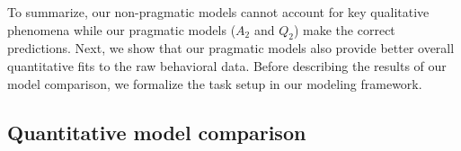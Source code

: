 \documentclass[11pt, floatsintext]{apa6}
\begin{document}


To summarize, our non-pragmatic models cannot account for key qualitative phenomena while our pragmatic models ($A_2$ and $Q_2$) make the correct predictions. 
Next, we show that our pragmatic models also provide better overall quantitative fits to the raw behavioral data. 
Before describing the results of our model comparison, we formalize the task setup in our modeling framework. 

\subsection{Quantitative model comparison}
\end{document}
